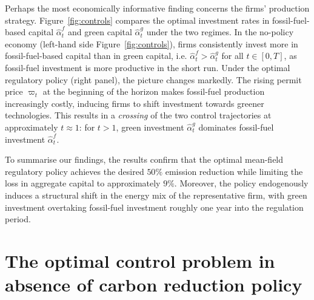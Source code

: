 \documentclass[11pt,twoside]{amsart}
\theoremstyle{definition}
\numberwithin{equation}{section}
\renewcommand{\hat}{\widehat}
\begin{document}
Perhaps the most economically informative finding concerns the firms' production strategy. Figure~\ref{fig:controls} compares the optimal investment rates in fossil-fuel-based capital $\hat\alpha^f_t$ and green capital $\hat\alpha^g_t$ under the two regimes.
In the no-policy economy (left-hand side Figure~\ref{fig:controls}), firms consistently
invest more in fossil-fuel-based capital than in green capital, i.e. $\hat\alpha^f_t > \hat\alpha^g_t$ for all $t\in[0,T]$, as fossil-fuel investment is more productive in the short run.
Under the optimal regulatory policy (right panel), the picture changes markedly. The
rising permit price $\varpi_t$ at the beginning of the horizon makes fossil-fuel production increasingly costly, inducing firms to shift investment towards greener technologies. This results in a \emph{crossing} of the two control trajectories at approximately $t \approx 1$: for $t > 1$, green investment $\hat\alpha^g_t$ dominates fossil-fuel investment $\hat\alpha^f_t$. 

To summarise our findings, the results confirm that the optimal mean-field regulatory policy achieves the desired $50\%$ emission reduction while limiting the loss in aggregate capital to approximately $9\%$. Moreover, the policy endogenously induces a structural shift in the energy mix of the representative firm, with green investment overtaking fossil-fuel investment
roughly one year into the regulation period.




\newpage

\newpage
\appendix

\section{The optimal control problem in absence of carbon reduction policy}
\label{app: unregulated market}
\end{document}
